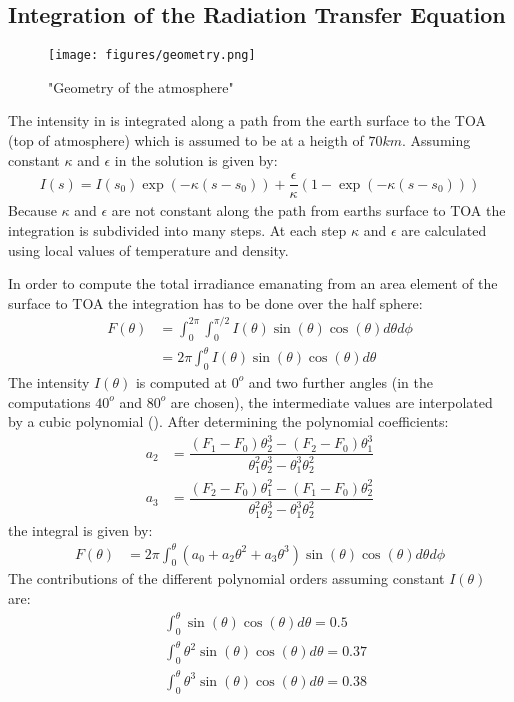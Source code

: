 \subsection{Integration of the Radiation Transfer Equation}

\begin{figure}[ht]
	\texttt{[image: figures/geometry.png]}
	\caption{"Geometry of the atmosphere"}
	\label{fig:geometry}
\end{figure}

The intensity in  is integrated along a path from the earth surface to the TOA (top of atmosphere) which is assumed to be at a heigth of $70 km$. Assuming constant $\kappa$ and $\epsilon$ in  the solution is given by:
\begin{align}
	I(s) = I(s_0) \exp( -  \kappa (s-s_0)) +  \dfrac{\epsilon}{\kappa} \left(1 - \exp( - \kappa (s-s_0))\right)
\end{align}
Because $\kappa$ and $\epsilon$ are not constant along the path from earths surface to TOA the integration is subdivided into many steps. At each step $\kappa$ and $\epsilon$ are calculated using local values of temperature and density.

In order to compute the total irradiance emanating from an area element of the surface to TOA the integration has to be done over the half sphere:
\begin{align}
	F(\theta) &= \int_0^{2 \pi} \int_0^{\pi/2} I(\theta) \sin(\theta) \cos(\theta)  d \theta d \phi \\
	  &= 2 \pi \int_0^{\theta} I(\theta) \sin(\theta) \cos(\theta) d \theta
\end{align}
The intensity $I(\theta)$ is computed at $0^o$ and two further angles (in the computations $40^o$ and $80^o$ are chosen), 
the intermediate values are interpolated by a cubic polynomial ().
After determining the polynomial coefficients:
\begin{align}
	a_2 &= \dfrac{(F_1 - F_0) \theta_2^3 - (F_2 - F_0) \theta_1^3}{\theta_1^2 \theta_2^3 - \theta_1^3 \theta_2^2} \\
	a_3 &= \dfrac{(F_2 - F_0) \theta_1^2 - (F_1 - F_0) \theta_2^2}{\theta_1^2 \theta_2^3 - \theta_1^3 \theta_2^2}
 \end{align}  
the integral is given by:
\begin{align}
	F(\theta) &= 2 \pi \int_0^{\theta} \left(a_0 + a_2 \theta^2 + a_3 \theta^3\right) \sin(\theta) \cos(\theta)  d \theta d \phi
\end{align}
The contributions of the different polynomial orders assuming constant $I(\theta)$ are:
\begin{align*}
	 &\int_0^{\theta} \sin(\theta) \cos(\theta) d \theta = 0.5 \\
	 &\int_0^{\theta} \theta^2 \sin(\theta) \cos(\theta) d \theta = 0.37  \\
	 &\int_0^{\theta} \theta^3 \sin(\theta) \cos(\theta) d \theta = 0.38
\end{align*}

